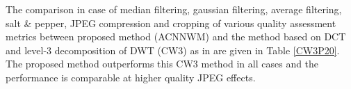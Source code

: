 The comparison in case of  median filtering, gaussian filtering, average filtering, salt \& pepper, JPEG compression and cropping of various quality assessment metrics between proposed method (ACNNWM) and the method based on DCT and level-3 decomposition of DWT (CW3) as in \cite{P20} are given in Table \ref{CW3P20}. The proposed method outperforms this CW3 method in all cases and the performance is comparable at higher quality JPEG effects.\\

\begin{table*}
\caption{Comparison with CW3 Method as in \cite{P20} }
\smallskip\noindent
{}
\end{table*}

